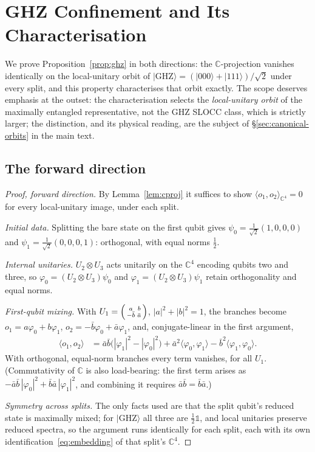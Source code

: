 \section{GHZ Confinement and Its Characterisation}
\label{app:ghz-proof}

We prove Proposition~\ref{prop:ghz} in both directions: the $\mathbb{C}$-projection vanishes
identically on the local-unitary orbit of
$\lvert\mathrm{GHZ}\rangle = (\lvert000\rangle+\lvert111\rangle)/\sqrt2$ under every split, and this
property characterises that orbit exactly. The scope deserves emphasis at the outset: the
characterisation selects the \emph{local-unitary orbit} of the maximally entangled representative,
not the GHZ SLOCC class, which is strictly larger; the distinction, and its physical reading, are
the subject of \S\ref{sec:canonical-orbits} in the main text.

\subsection{The forward direction}

\begin{proof}[Proof, forward direction]
By Lemma~\ref{lem:cproj} it suffices to show $\langle o_1,o_2\rangle_{\mathbb{C}^4} = 0$ for every
local-unitary image, under each split.

\emph{Initial data.} Splitting the bare state on the first qubit gives
$\psi_0 = \tfrac1{\sqrt2}(1,0,0,0)$ and $\psi_1 = \tfrac1{\sqrt2}(0,0,0,1)$: orthogonal, with equal
norms $\tfrac12$.

\emph{Internal unitaries.} $U_2\otimes U_3$ acts unitarily on the $\mathbb{C}^4$ encoding qubits two
and three, so $\varphi_0 = (U_2\otimes U_3)\psi_0$ and $\varphi_1 = (U_2\otimes U_3)\psi_1$ retain
orthogonality and equal norms.

\emph{First-qubit mixing.} With
$U_1 = \begin{psmallmatrix} a & b\\ -\bar b & \bar a\end{psmallmatrix}$, $|a|^2+|b|^2 = 1$, the
branches become $o_1 = a\varphi_0+b\varphi_1$, $o_2 = -\bar b\varphi_0+\bar a\varphi_1$, and,
conjugate-linear in the first argument,
\begin{align}
  \langle o_1,o_2\rangle
  &= \bar a\bar b\bigl(|\varphi_1|^2-|\varphi_0|^2\bigr)
   + \bar a^2\langle\varphi_0,\varphi_1\rangle
   - \bar b^2\langle\varphi_1,\varphi_0\rangle.
  \label{eq:general-ip}
\end{align}
With orthogonal, equal-norm branches every term vanishes, for all $U_1$. (Commutativity of
$\mathbb{C}$ is also load-bearing: the first term arises as
$-\bar a\bar b\,|\varphi_0|^2 + \bar b\bar a\,|\varphi_1|^2$, and combining it requires
$\bar a\bar b = \bar b\bar a$.)

\emph{Symmetry across splits.} The only facts used are that the split qubit's reduced state is
maximally mixed; for $\lvert\mathrm{GHZ}\rangle$ all three are $\tfrac12\mathbb{1}$, and local
unitaries preserve reduced spectra, so the argument runs identically for each split, each with its
own identification~\eqref{eq:embedding} of that split's $\mathbb{C}^4$.
\end{proof}

